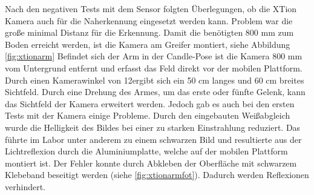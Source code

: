Nach den negativen Tests mit dem Sensor folgten Überlegungen, ob die XTion Kamera auch für die Naherkennung eingesetzt werden kann. Problem war die große minimal Distanz für die Erkennung. Damit die benötigten 800 mm zum Boden erreicht werden, ist die Kamera am Greifer montiert, siehe Abbildung \ref{fig:xtionarm} Befindet sich der Arm in der Candle-Pose ist die Kamera 800 mm vom Untergrund entfernt und erfasst das Feld direkt vor der mobilen Plattform. Durch einen Kamerawinkel von 12\textdegree ergibt sich ein 50 cm langes und 60 cm breites Sichtfeld. Durch eine Drehung des Armes, um das erste oder fünfte Gelenk, kann das Sichtfeld der Kamera erweitert werden. Jedoch gab es auch bei den ersten Tests mit der Kamera einige Probleme. Durch den eingebauten Weißabgleich wurde die Helligkeit des Bildes bei einer zu starken Einstrahlung reduziert. Das führte im Labor unter anderem zu einem schwarzen Bild und resultierte aus der Lichtreflexion durch die Aluminiumplatte, welche auf der mobilen Plattform montiert ist. Der Fehler konnte durch Abkleben der Oberfläche mit schwarzem Klebeband beseitigt werden (siehe \ref{fig:xtionarmfot}). Dadurch werden Reflexionen verhindert.


